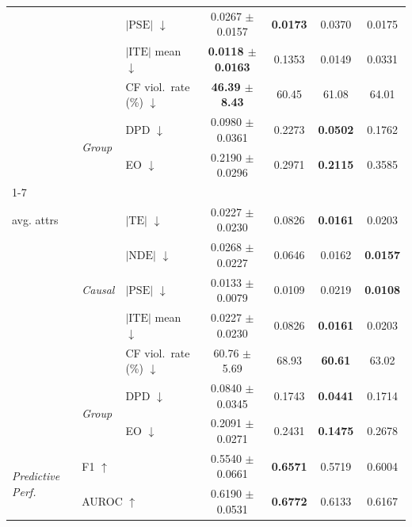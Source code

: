 \begin{table}[t]
\begin{tabular}{@{}lll cccc@{}}
  & & $|\mathrm{PSE}|$ $\downarrow$ & 0.0267 $\pm$ 0.0157 & \textbf{0.0173} & 0.0370 & 0.0175 \\
  & & $|\mathrm{ITE}|$ mean $\downarrow$ & \textbf{0.0118 $\pm$ 0.0163} & 0.1353 & 0.0149 & 0.0331 \\
  & & CF viol.\ rate (\%) $\downarrow$ & \textbf{46.39 $\pm$ 8.43} & 60.45 & 61.08 & 64.01 \\
  & \multirow{2}{*}{\scriptsize\textit{Group}} & DPD $\downarrow$ & 0.0980 $\pm$ 0.0361 & 0.2273 & \textbf{0.0502} & 0.1762 \\
  & & EO $\downarrow$ & 0.2190 $\pm$ 0.0296 & 0.2971 & \textbf{0.2115} & 0.3585 \\
\cmidrule(lr){1-7}
  \multirow{7}{*}{\makecell[l]{\textit{Overall}\\[-2pt]\scriptsize avg. attrs}} & \multirow{5}{*}{\scriptsize\textit{Causal}} & $|\mathrm{TE}|$ $\downarrow$ & 0.0227 $\pm$ 0.0230 & 0.0826 & \textbf{0.0161} & 0.0203 \\
  & & $|\mathrm{NDE}|$ $\downarrow$ & 0.0268 $\pm$ 0.0227 & 0.0646 & 0.0162 & \textbf{0.0157} \\
  & & $|\mathrm{PSE}|$ $\downarrow$ & 0.0133 $\pm$ 0.0079 & 0.0109 & 0.0219 & \textbf{0.0108} \\
  & & $|\mathrm{ITE}|$ mean $\downarrow$ & 0.0227 $\pm$ 0.0230 & 0.0826 & \textbf{0.0161} & 0.0203 \\
  & & CF viol.\ rate (\%) $\downarrow$ & 60.76 $\pm$ 5.69 & 68.93 & \textbf{60.61} & 63.02 \\
  & \multirow{2}{*}{\scriptsize\textit{Group}} & DPD $\downarrow$ & 0.0840 $\pm$ 0.0345 & 0.1743 & \textbf{0.0441} & 0.1714 \\
  & & EO $\downarrow$ & 0.2091 $\pm$ 0.0271 & 0.2431 & \textbf{0.1475} & 0.2678 \\
\midrule
\multirow{2}{*}{\textit{Predictive Perf.}} & \multicolumn{2}{l}{F1 $\uparrow$} & 0.5540 $\pm$ 0.0661 & \textbf{0.6571} & 0.5719 & 0.6004 \\
  & \multicolumn{2}{l}{AUROC $\uparrow$} & 0.6190 $\pm$ 0.0531 & \textbf{0.6772} & 0.6133 & 0.6167 \\
\bottomrule
\end{tabular}
\end{table}